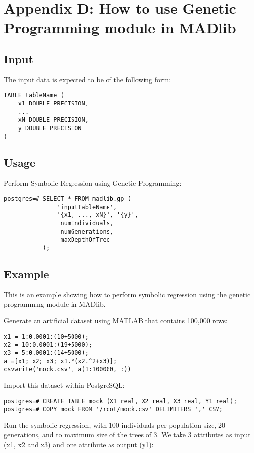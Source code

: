 \section*{Appendix D: How to use Genetic Programming module in MADlib}
\subsection*{Input}
The input data is expected to be of the following form:
\begin{verbatim}
TABLE tableName (
    x1 DOUBLE PRECISION,
    ...
    xN DOUBLE PRECISION,
    y DOUBLE PRECISION
)
\end{verbatim}

\subsection*{Usage}
Perform Symbolic Regression using Genetic Programming:
\begin{verbatim}
postgres=# SELECT * FROM madlib.gp (
               'inputTableName', 
               '{x1, ..., xN}', '{y}', 
                numIndividuals, 
                numGenerations, 
                maxDepthOfTree
           );
\end{verbatim}

\subsection*{Example}
This is an example showing how to perform symbolic regression using the genetic programming module in MADlib. 

\vspace{\baselineskip}
{\raggedleft Generate an artificial dataset using MATLAB that contains 100,000 rows:}

\lstset{language=Matlab}
\lstset{tabsize=4}
\begin{lstlisting}
x1 = 1:0.0001:(10+5000);
x2 = 10:0.0001:(19+5000);
x3 = 5:0.0001:(14+5000);
a =[x1; x2; x3; x1.*(x2.^2+x3)];
csvwrite('mock.csv', a(1:100000, :))
\end{lstlisting}

{\raggedleft Import this dataset within PostgreSQL:}
\begin{verbatim}
postgres=# CREATE TABLE mock (X1 real, X2 real, X3 real, Y1 real);
postgres=# COPY mock FROM '/root/mock.csv' DELIMITERS ',' CSV;
\end{verbatim}

{\raggedleft Run the symbolic regression, with 100 individuals per population size, 20 generations, and to maximum size of the trees of 3. We take 3 attributes as input (x1, x2 and x3) and one attribute as output (y1):}

